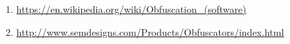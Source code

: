 \begin{englishtext}
\begin{sloppypar}
\begin{bluebox}
\begin{enumerate}[leftmargin=*,parsep=0pt]
    \item \url{https://en.wikipedia.org/wiki/Obfuscation_(software)}

    \item \url{http://www.semdesigns.com/Products/Obfuscators/index.html}

    \end{enumerate}
    \end{bluebox}
    \end{sloppypar}

\end{englishtext}


\lang{}{}


